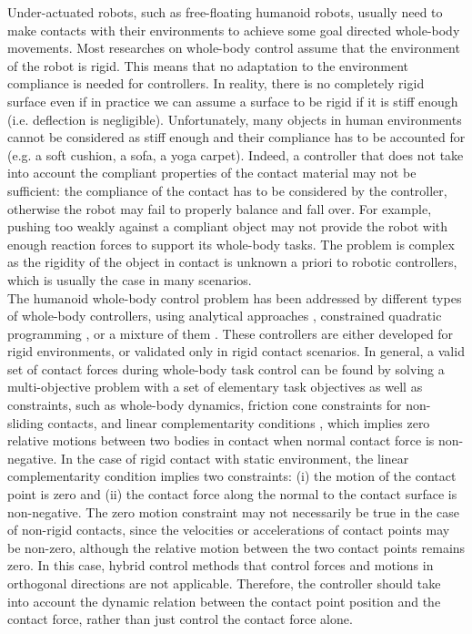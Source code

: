 \documentclass[12pt,a4paper,twoside]{article}
\begin{document}
Under-actuated robots, such as free-floating humanoid robots, usually need to make contacts with their environments to achieve some goal directed whole-body movements. Most researches on whole-body control assume that the environment of the robot is rigid. This means that no adaptation to the environment compliance is needed for controllers. In reality, there is no completely rigid surface even if in practice we can assume a surface to be rigid if it is stiff enough (i.e. deflection is negligible). Unfortunately, many objects in human environments cannot be considered as stiff enough and their compliance has to be accounted for (e.g. a soft cushion, a sofa, a yoga carpet). Indeed, a controller that does not take into account the compliant  properties of the contact material may not be sufficient:  the compliance of
the contact has to be considered by the controller, otherwise the robot may fail to properly balance and fall over. For example, %
pushing too weakly against a compliant object may not provide the robot with enough reaction forces to support its whole-body tasks. The problem is complex as the rigidity of the object in contact is unknown a priori to robotic controllers, which is usually the case in many scenarios.\\
 

The humanoid whole-body control problem has been addressed by different types of whole-body controllers, using analytical approaches \cite{Khatib08,Sentis10,Righetti13}, constrained quadratic programming \cite{Abe07,Liu11,Salini11,Salini13,Saab13}, or a mixture of them \cite{Stephens10,Nori15}. These controllers are either developed for rigid environments, or validated only in rigid contact scenarios.
In general, a valid set of contact forces during whole-body task control can be found by solving a multi-objective problem with a set of elementary task objectives as well as constraints, such as whole-body dynamics, friction cone constraints for non-sliding contacts, and linear complementarity conditions \cite{Muico09,Saab13,Salini11,Salini13}, which implies zero relative motions between two bodies in contact when normal contact force is non-negative. In the case of rigid contact with static environment, the linear complementarity condition implies two constraints: (i) the motion of the contact point is zero and (ii) the contact force along the normal to the contact surface is non-negative.  The zero motion constraint may not necessarily be true in the case of non-rigid contacts, since the velocities or accelerations of contact points may be non-zero, although the relative motion between the two contact points remains zero. In this case, hybrid control methods \cite{khatib87} that control forces and motions in orthogonal directions are not applicable. Therefore, the controller should take into account the dynamic relation between the contact point position and the contact force, rather than just control the contact force alone.\\ 
\end{document}
